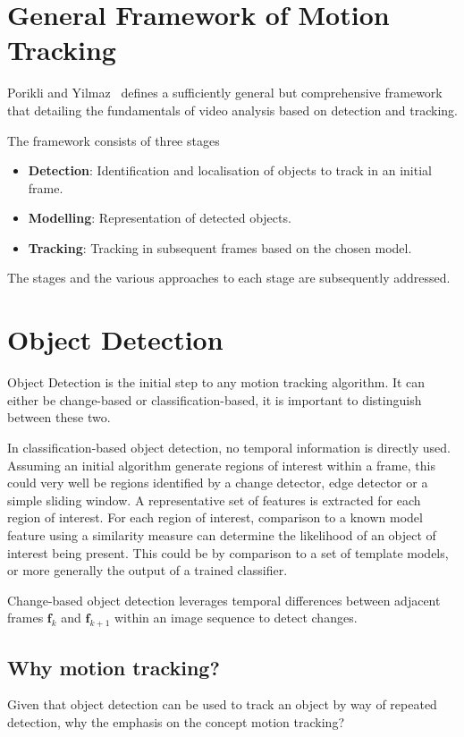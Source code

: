 \section{General Framework of Motion Tracking}
Porikli and Yilmaz~\cite{Porikli2012} defines a sufficiently general but
comprehensive framework that detailing the fundamentals of video
analysis based on detection and tracking. 

The framework consists of three stages
\begin{itemize}
    \item \textbf{Detection}: Identification and localisation of objects to
        track in an initial frame.
    \item \textbf{Modelling}: Representation of detected objects.
    \item \textbf{Tracking}: Tracking in subsequent frames based on the chosen
        model.
\end{itemize}

The stages and the various approaches to each stage are subsequently addressed.

\section{Object Detection}\label{literature_review_object_detection}
Object Detection is the initial step to any motion tracking algorithm. It can
either be change-based or classification-based, it is important to distinguish
between these two.

In classification-based object detection, no temporal information is directly
used. Assuming an initial algorithm generate regions of interest within a frame, this
could very well be regions identified by a change detector, edge detector or a
simple sliding window. A representative set of features is extracted for each
region of interest. For each region of interest, comparison to a known model
feature using a similarity measure can determine the likelihood of an object of
interest being present. 
This could be by comparison to a set of template models, or more generally the
output of a trained classifier.

Change-based object detection leverages temporal differences between adjacent frames
$\mathbf{f}_k$ and $\mathbf{f}_{k+1}$ within an image sequence to detect
changes. 

\subsection{Why motion tracking?}
Given that object detection can be used to track an object by way of repeated
detection, why the emphasis on the concept motion tracking?

